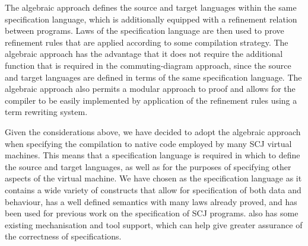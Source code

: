 The algebraic approach defines the source and target languages within
the same specification language, which is additionally equipped with a
refinement relation between programs.
Laws of the specification language are then used to prove refinement
rules that are applied according to some compilation strategy.
The algebraic approach has the advantage that it does not require the
additional function that is required in the commuting-diagram
approach, since the source and target languages are defined in terms
of the same specification language.
The algebraic approach also permits a modular approach to proof and
allows for the compiler to be easily implemented by application of the
refinement rules using a term rewriting system.

Given the considerations above, we have decided to adopt the algebraic
approach when specifying the compilation to native code employed by
many SCJ virtual machines.
This means that a specification language is required in which to
define the source and target languages, as well as for the purposes of
specifying other aspects of the virtual machine.
We have chosen \Circus{} as the specification language as it contains
a wide variety of constructs that allow for specification of both data
and behaviour, has a well defined semantics with many laws already
proved, and has been used for previous work on the specification of
SCJ programs.
\Circus{} also has some existing mechanisation and tool support, which
can help give greater assurance of the correctness of specifications.